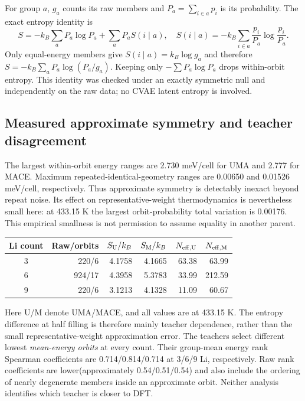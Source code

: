 \documentclass[10pt]{article}
\begin{document}
For group $a$, $g_a$ counts its raw members and $P_a=\sum_{i\in a}p_i$ is its
probability. The exact entropy identity is
\begin{equation}
S=-k_B\sum_aP_a\log P_a+\sum_a P_a S(i\mid a),\quad
S(i\mid a)=-k_B\sum_{i\in a}\frac{p_i}{P_a}\log\frac{p_i}{P_a}.
\end{equation}
Only equal-energy members give $S(i\mid a)=k_B\log g_a$ and therefore
$S=-k_B\sum_aP_a\log(P_a/g_a)$. Keeping only $-\sum P_a\log P_a$ drops
within-orbit entropy. This identity was checked under an exactly symmetric null
and independently on the raw data; no CVAE latent entropy is involved.
\newpage

\subsection{Measured approximate symmetry and teacher disagreement}
The largest within-orbit energy ranges are 2.730 meV/cell for UMA and 2.777 for MACE.
Maximum repeated-identical-geometry ranges are 0.00650 and 0.01526 meV/cell,
respectively. Thus approximate symmetry is detectably inexact beyond repeat
noise. Its effect on representative-weight thermodynamics is nevertheless small
here: at 433.15 K the largest orbit-probability total variation is 0.00176.
This empirical smallness is not permission to assume equality in another parent.

\begin{center}\small
\begin{tabular}{crrrrr}\toprule
Li count&Raw/orbits&$S_{\rm U}/k_B$&$S_{\rm M}/k_B$&$N_{\rm eff,U}$&$N_{\rm eff,M}$\\\midrule
3&220/6&4.1758&4.1665&63.38&63.99\\
6&924/17&4.3958&5.3783&33.99&212.59\\
9&220/6&3.1213&4.1328&11.09&60.67\\\bottomrule
\end{tabular}
\end{center}
Here U/M denote UMA/MACE, and all values are at 433.15 K. The entropy difference
at half filling is therefore mainly teacher dependence, rather than the small
representative-weight approximation error. The teachers select different
lowest \emph{mean-energy orbits} at every count. Their group-mean energy rank
Spearman coefficients are 0.714/0.814/0.714 at 3/6/9 Li, respectively. Raw rank
coefficients are lower(approximately 0.54/0.51/0.54) and also include the ordering
of nearly degenerate members inside an approximate orbit. Neither analysis
identifies which teacher is closer to DFT.
\end{document}
